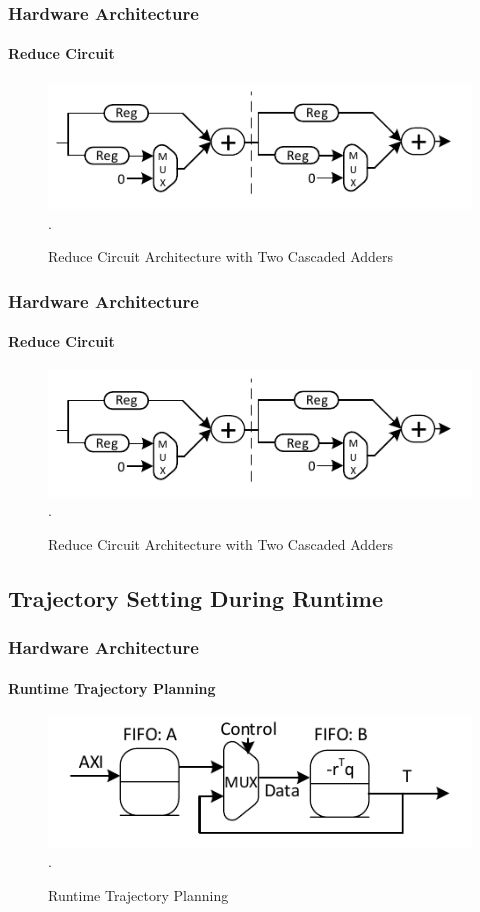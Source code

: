 \documentclass{beamer}
\begin{document}
\begin{frame}
\frametitle{Hardware Architecture}
\framesubtitle{Reduce Circuit}
\begin{figure}[t]
\centering
\captionsetup{justification=centering}
\includegraphics[scale=0.9]{../ASAP_17/figure/Reduce.pdf}
\DeclareGraphicsExtensions.
\caption{Reduce Circuit Architecture with Two Cascaded Adders\label{fig_red}}
\end{figure}
\end{frame}
\begin{frame}
\frametitle{Hardware Architecture}
\framesubtitle{Reduce Circuit}
\begin{figure}[t]
\centering
\captionsetup{justification=centering}
\includegraphics[scale=0.9]{../ASAP_17/figure/Reduce.pdf}
\DeclareGraphicsExtensions.
\caption{Reduce Circuit Architecture with Two Cascaded Adders\label{fig_red}}
\end{figure}
\end{frame}



\subsection{Trajectory Setting During Runtime}
\begin{frame}
\frametitle{Hardware Architecture}
\framesubtitle{Runtime Trajectory Planning}
\begin{figure}[t]
\centering
\captionsetup{justification=centering}
\includegraphics[scale=.75]{../ASAP_17/figure/trajectoryProfile.pdf}
\DeclareGraphicsExtensions.
\caption{Runtime Trajectory Planning\label{fig_traj}}
\end{figure}
\end{frame}
\end{document}
